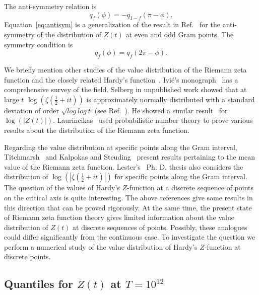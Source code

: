 \documentclass[twoside]{article}
\begin{document}
The anti-symmetry relation is
\begin{equation}
q_{f}(\phi) = -q_{1-f}(\pi-\phi).
\label{eq:antisym}
\end{equation}
Equation~\ref{eq:antisym}  is a generalization of the result in Ref.~\cite{Shanker 2018a} for the anti-symmetry of the distribution of $Z(t)$ at even and odd Gram points. The  symmetry condition is
\begin{equation}
q_{f}(\phi) = q_{f}(2\pi-\phi).
\label{eq:sym}
\end{equation}


We briefly mention other studies of the value distribution of the Riemann zeta function and the closely related Hardy's function~\cite{Hardy 1918}.  Ivi\'c's monograph~\cite{Ivic 2013} has a comprehensive survey of  the field.
Selberg in unpublished work showed that at large $t$ $\log (\zeta(\frac{1}{2} + it))$ is approximately normally distributed with a standard deviation of order $\sqrt{log~log~t}$ (see Ref.~\cite{Hejhal}). He showed a 
similar result~\cite{Selberg 1989, Selberg 1991} for $\log (|Z(t)|)$. Laurincikas~\cite{Laurincikas}  used probabilistic number theory to prove various results about the distribution of the Riemann zeta function.

Regarding the value distribution at specific points along the Gram interval, Titchmarsh~\cite{Titchmarsh 1934} and Kalpokas and Steuding~\cite{kalpokas 2009} present results pertaining to the
mean value of the Riemann zeta function. Lester's~\cite{Lester 2013} Ph. D. thesis also considers the distribution of $\log (|\zeta(\frac{1}{2} + it)|)$  for specific points along the Gram interval.  
The question of the values of Hardy's $Z$-function at a discrete sequence of points on the critical axis is quite interesting. The above references give some results in this direction that can be proved rigorously. At the same time, the present state of Riemann zeta function theory gives limited information about the value distribution of $Z(t)$ at discrete sequences of points. Possibly, these analogues could differ significantly from the continuous case. To investigate the question we perform a numerical study of the value distribution of Hardy's $Z$-function at discrete points. 


\subsection{\label{E12}Quantiles for $Z(t)$ at $T=10^{12}$}
\end{document}
